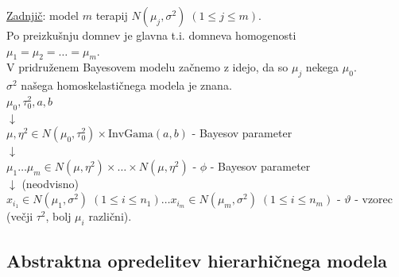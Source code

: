 \documentclass[a4paper, 12pt]{book}
\theoremstyle{definition}
\theoremstyle{remark}
\begin{document}

\underline{Zadnjič}: model $m$ terapij $N(\mu_j, \sigma^2) \; (1 \leq j \leq m)$. \\
Po preizkušnju domnev je glavna t.i. domneva homogenosti \\
$\mu_1 = \mu_2 = \dots = \mu_m$. \\
V pridruženem Bayesovem modelu začnemo z idejo, da so $\mu_j$  nekega  $\mu_0$. \\
$\sigma^2$ našega homoskelastičnega modela je znana. \\
$\mu_0, \tau_0^2, a, b$ \\
$\downarrow$ \\
$\mu, \eta^2 \in N(\mu_0, \tau_0^2) \times \text{InvGama}(a,b)$ - Bayesov parameter \\
$\downarrow$ \\
$\mu_1 \dots \mu_m \in N(\mu, \eta^2) \times \dots \times N(\mu, \eta^2)$ - $\phi$ - Bayesov parameter \\
$\downarrow$ (neodvisno) \\
$x_{i_1} \in N(\mu_1, \sigma^2) \; (1 \leq i \leq n_1) \dots x_{i_m} \in N(\mu_m, \sigma^2) \; (1 \leq i \leq n_m)$
- $\vartheta$ - vzorec \\
(večji $\tau^2$, bolj $\mu_i$ različni). \\

\subsection{Abstraktna opredelitev hierarhičnega modela}
\end{document}
